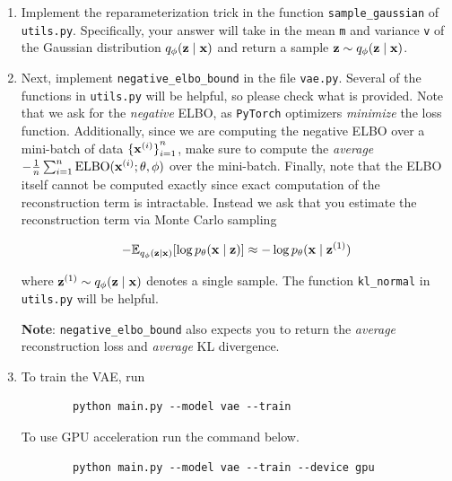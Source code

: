 \begin{enumerate}[label=(\alph*)]
    \item {} Implement the reparameterization trick in the function \texttt{sample\_gaussian} of \texttt{utils.py}. 
    Specifically, your answer will take in the mean \texttt{m} and variance \texttt{v} of the Gaussian distribution 
    $q_{\phi}(\mathbf{z} \mid \mathbf{x})$ and return a sample $\mathbf{z} \sim q_{\phi}(\mathbf{z} \mid \mathbf{x})$.

    \item {} Next, implement \texttt{negative\_elbo\_bound} in the file \texttt{vae.py}. Several of the functions in \texttt{utils.py} 
    will be helpful, so please check what is provided. Note that we ask for the \textit{negative} ELBO, as \texttt{PyTorch} optimizers 
    \textit{minimize} the loss function. Additionally, since we are computing the negative ELBO over a mini-batch of data 
    ${\{\mathbf{x}^{(i)}\}}_{i=1}^{n}$, make sure to compute the \textit{average} $- \frac{1}{n}\sum_{i=1}^{n} \text{ELBO}(\mathbf{x}^{(i)}; \theta, \phi)$ 
    over the mini-batch. Finally, note that the ELBO itself cannot be computed exactly since exact computation of the reconstruction 
    term is intractable. Instead we ask that you estimate the reconstruction term via Monte Carlo sampling

    \begin{equation} \label{eq:5}
        - \mathbb{E}_{q_{\phi}(\mathbf{z} \mid \mathbf{x})} [\log p_{\theta}(\mathbf{x} \mid \mathbf{z})] \approx - \log p_{\theta}(\mathbf{x} \mid \mathbf{z}^{(1)})
    \end{equation}

    where $\mathbf{z}^{(1)} \sim q_{\phi}(\mathbf{z} \mid \mathbf{x})$ denotes a single sample. The function \texttt{kl\_normal} in \texttt{utils.py} 
    will be helpful.
    
    \textbf{Note}: \texttt{negative\_elbo\_bound} also expects you to return the \textit{average} reconstruction loss 
    and \textit{average} KL divergence.

    \item {} To train the VAE, run
    
    \begin{verbatim}
        python main.py --model vae --train
    \end{verbatim}

    To use GPU acceleration run the command below.
    \begin{verbatim}
        python main.py --model vae --train --device gpu
    \end{verbatim}
    

\end{enumerate}
